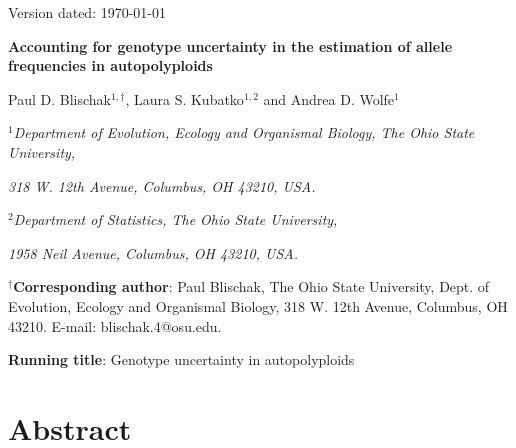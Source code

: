 \documentclass[11pt,english,letterpaper,oneside]{article}
\begin{document}
\newcommand{\tmat}{$\bm{T}$}
\newcommand{\rmat}{$\bm{R}$}
\newcommand{\etal}{\textit{et al}.}

\hfill Version dated: \mydate\today
\vspace{0.25in}

\begin{center}

{\LARGE  \bfseries Accounting for genotype uncertainty in the estimation of allele frequencies in autopolyploids}
\vspace{0.45in}

Paul D. Blischak$^{1,\dagger}$, Laura S. Kubatko$^{1,2}$ and Andrea D. Wolfe$^1$
\vspace{0.45in}


\textit{$^1$Department of Evolution, Ecology and Organismal Biology, The Ohio State University,}

\textit{318 W. 12th Avenue, Columbus, OH 43210, USA.}
\bigskip
\bigskip

\textit{$^2$Department of Statistics, The Ohio State University,}

\textit{1958 Neil Avenue, Columbus, OH 43210, USA.}


\end{center}
\vspace{0.45in}


\noindent $^\dagger$\textbf{Corresponding author}: Paul Blischak, The Ohio State University, Dept. of Evolution, Ecology and Organismal Biology, 318 W. 12th Avenue, Columbus, OH 43210. E-mail: blischak.4@osu.edu.

\vspace{0.45in}

\noindent \textbf{Running title}: Genotype uncertainty in autopolyploids

\vspace{.45in}

\section*{Abstract}                      %
\end{document}
